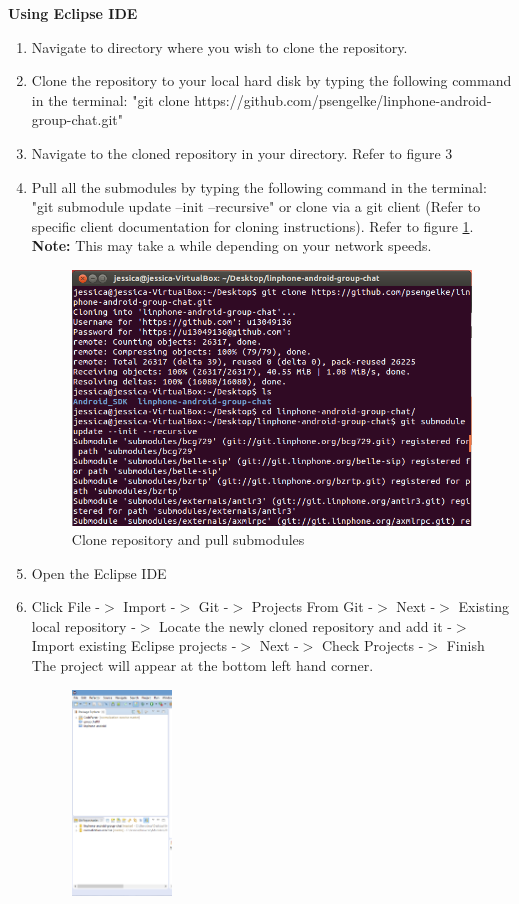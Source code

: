 \documentclass[11pt]{article}
\begin{document}
\textbf{Using Eclipse IDE}
\begin{enumerate}
\item Navigate to directory where you wish to clone the repository. 
\item Clone the repository to your local hard disk by typing the following command in the terminal: "git clone https://github.com/psengelke/linphone-android-group-chat.git" 
\item Navigate to the cloned repository in your directory. Refer to figure 3
\item Pull all the submodules by typing the following command in the terminal: "git submodule update --init --recursive" or clone via a git client (Refer to specific client documentation for cloning instructions). Refer to figure \ref{cmd_clone}. \\
\textbf{Note:} This may take a while depending on your network speeds.
\begin{figure}[H]
\centering
\includegraphics[width=5in]{./images/clone.png}
\caption{Clone repository and pull submodules}
\label{cmd_clone}
\end{figure}
\item Open the Eclipse IDE
\item Click File -$>$ Import -$>$ Git -$>$ Projects From Git -$>$ Next -$>$ Existing local repository -$>$ Locate the newly cloned repository and add it -$>$ Import existing Eclipse projects -$>$ Next -$>$ Check Projects -$>$ Finish
\subitem The project will appear at the bottom left hand corner.
\begin{figure}[H]
\centering
\includegraphics[width=100px]{./images/git.png}

\end{figure}
\end{enumerate}
\end{document}
